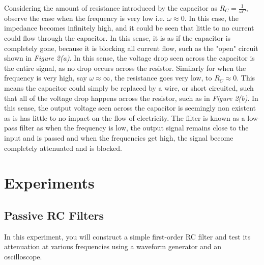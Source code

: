 \documentclass[12pt]{article}
\begin{document}
Considering the amount of resistance introduced by the capacitor as $R_{C} = \frac{1}{\omega C}$, observe the case when the frequency is very low i.e. $\omega \approx 0$. In this case, the impedance becomes infinitely high, and it could be seen that little to no current could flow through the capacitor. In this sense, it is as if the capacitor is completely gone, because it is blocking all current flow, such as the "open" circuit shown in \textit{Figure 2(a)}. In this sense, the voltage drop seen across the capacitor is the entire signal, as no drop occurs across the resistor. Similarly for when the frequency is very high, say $\omega \approx \infty$, the resistance goes very low, to $R_{C} \approx 0$. This means the capacitor could simply be replaced by a wire, or short circuited, such that all of the voltage drop happens across the resistor, such as in \textit{Figure 2(b)}. In this sense, the output voltage seen across the capacitor is seemingly non existent as is has little to no impact on the flow of electricity. The filter is known as a low-pass filter as when the frequency is low, the output signal remains close to the input and is passed and when the frequencies get high, the signal become completely attenuated and is blocked.

\section{Experiments}
\subsection{Passive RC Filters}

In this experiment, you will construct a simple first-order RC filter and test its attenuation at various frequencies using a waveform generator and an oscilloscope.
\end{document}
